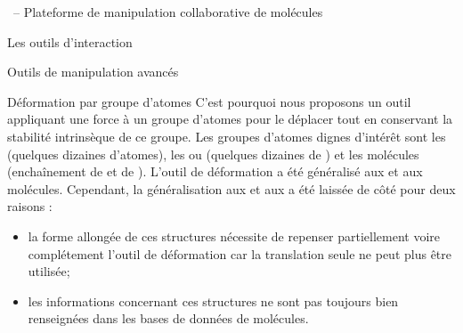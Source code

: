 \documentclass[myfrancais,ngerman,english,french]{mythesis}
\begin{document}
\begin{mychapter}{\myShaddock\ -- Plateforme de manipulation collaborative de molécules}
\begin{mysection}{Les outils d'interaction}
\begin{mysubsection}{Outils de manipulation avancés}
\begin{mysubsubsection}{Déformation par groupe d'atomes}
					C'est pourquoi nous proposons un outil appliquant une force à un groupe d'atomes pour le déplacer tout en conservant la stabilité intrinsèque de ce groupe.
					Les groupes d'atomes dignes d'intérêt sont les  (quelques dizaines d'atomes), les \myhelice* ou \myfeuillet* (quelques dizaines de ) et les molécules (enchaînement de \myhelice* et de \myfeuillet*).
					L'outil de déformation a été généralisé aux  et aux molécules.
					Cependant, la généralisation aux \myhelice* et aux \myfeuillet* a été laissée de côté pour deux raisons :
					\begin{itemize}
						\item la forme allongée de ces structures nécessite de repenser partiellement voire complétement l'outil de déformation car la translation seule ne peut plus être utilisée;
						\item les informations concernant ces structures ne sont pas toujours bien renseignées dans les bases de données de molécules.
					\end{itemize}


\end{mysubsubsection}
\end{mysubsection}
\end{mysection}
\end{mychapter}
\end{document}
